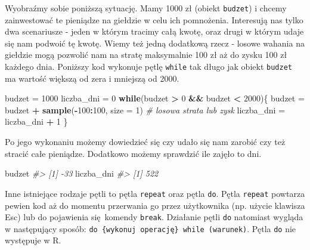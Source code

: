 \documentclass[paper=6in:9in,pagesize=pdftex,headinclude=on,footinclude=on,10pt]{scrbook}
\makeatletter
\newenvironment{Shaded}{\begin{snugshade}}{\end{snugshade}}
\newcommand{\CommentTok}[1]{\textcolor[rgb]{0.56,0.35,0.01}{\textit{#1}}}
\newcommand{\ControlFlowTok}[1]{\textcolor[rgb]{0.13,0.29,0.53}{\textbf{#1}}}
\newcommand{\DataTypeTok}[1]{\textcolor[rgb]{0.13,0.29,0.53}{#1}}
\newcommand{\DecValTok}[1]{\textcolor[rgb]{0.00,0.00,0.81}{#1}}
\newcommand{\KeywordTok}[1]{\textcolor[rgb]{0.13,0.29,0.53}{\textbf{#1}}}
\newcommand{\NormalTok}[1]{#1}
\newcommand{\OperatorTok}[1]{\textcolor[rgb]{0.81,0.36,0.00}{\textbf{#1}}}
\newcommand{\StringTok}[1]{\textcolor[rgb]{0.31,0.60,0.02}{#1}}
\newenvironment{kframe}{%
\medskip{}
\setlength{\fboxsep}{.8em}
 \def\at@end@of@kframe{}%
 \ifinner\ifhmode%
  \def\at@end@of@kframe{\end{minipage}}%
  \begin{minipage}{\columnwidth}%
 \fi\fi%
 \def\FrameCommand##1{\hskip\@totalleftmargin \hskip-\fboxsep
 \colorbox{shadecolor}{##1}\hskip-\fboxsep
     \hskip-\linewidth \hskip-\@totalleftmargin \hskip\columnwidth}%
 \MakeFramed {\advance\hsize-\width
   \@totalleftmargin\z@ \linewidth\hsize
   \@setminipage}}%
 {\par\unskip\endMakeFramed%
 \at@end@of@kframe}
\newenvironment{rmdblock}[1]
  {
  \begin{itemize}
  \renewcommand{\labelitemi}{
    \raisebox{-.7\height}[0pt][0pt]{
      {\setkeys{Gin}{width=3em,keepaspectratio}\texttt{[image: images/\#1]}}
    }
  }
  \setlength{\fboxsep}{1em}
  \begin{kframe}
  \item
  }
  {
  \end{kframe}
  \end{itemize}
  }
\newenvironment{rmdinfo}
  {\begin{rmdblock}{compass}}
  {\end{rmdblock}}
\makeatother
\begin{document}
Wyobraźmy sobie poniższą sytuację.
Mamy 1000 zł (obiekt \texttt{budzet}) i chcemy zainwestować te pieniądze na giełdzie w celu ich pomnożenia.
Interesują nas tylko dwa scenariusze - jeden w którym tracimy całą kwotę, oraz drugi w którym udaje się nam podwoić tę kwotę.
Wiemy też jedną dodatkową rzecz - losowe wahania na giełdzie mogą pozwolić nam na stratę maksymalnie 100 zł aż do zysku 100 zł każdego dnia.
Poniższy kod wykonuje pętlę \texttt{while} tak długo jak obiekt \texttt{budzet} ma wartość większą od zera i mniejszą od 2000.

\begin{Shaded}
\begin{Highlighting}[]
\NormalTok{budzet =}\StringTok{ }\DecValTok{1000}
\NormalTok{liczba_dni =}\StringTok{ }\DecValTok{0}
\ControlFlowTok{while}\NormalTok{(budzet }\OperatorTok{>}\StringTok{ }\DecValTok{0} \OperatorTok{&&}\StringTok{ }\NormalTok{budzet }\OperatorTok{<}\StringTok{ }\DecValTok{2000}\NormalTok{)\{}
\NormalTok{  budzet =}\StringTok{ }\NormalTok{budzet }\OperatorTok{+}\StringTok{ }\KeywordTok{sample}\NormalTok{(}\OperatorTok{-}\DecValTok{100}\OperatorTok{:}\DecValTok{100}\NormalTok{, }\DataTypeTok{size =} \DecValTok{1}\NormalTok{) }\CommentTok{# losowa strata lub zysk}
\NormalTok{  liczba_dni =}\StringTok{ }\NormalTok{liczba_dni }\OperatorTok{+}\StringTok{ }\DecValTok{1}
\NormalTok{\}}
\end{Highlighting}
\end{Shaded}

Po jego wykonaniu możemy dowiedzieć się czy udało się nam zarobić czy też stracić całe pieniądze.
Dodatkowo możemy sprawdzić ile zajęło to dni.

\begin{Shaded}
\begin{Highlighting}[]
\NormalTok{budzet}
\CommentTok{#> [1] -33}
\NormalTok{liczba_dni}
\CommentTok{#> [1] 522}
\end{Highlighting}
\end{Shaded}

\begin{rmdinfo}
\begin{rmdinfo}

Inne istniejące rodzaje pętli to pętla \texttt{repeat} oraz pętla \texttt{do}.
Pętla \texttt{repeat} powtarza pewien kod aż do momentu przerwania go przez użytkownika (np. użycie klawisza Esc) lub do pojawienia się~komendy \texttt{break}.
Działanie pętli \texttt{do} natomiast wygląda w następujący sposób:
\texttt{do\ \{wykonuj\ operację\}\ while\ (warunek)}.
Pętla \texttt{do} nie występuje w R.

\end{rmdinfo}
\end{rmdinfo}
\end{document}
